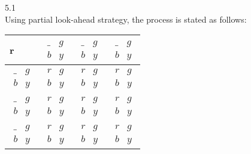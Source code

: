 \documentclass[a4paper]{article}
\begin{document}
5.1\\
Using partial look-ahead strategy, the process is stated as follows:\\
\begin{tabular}{|l|l|l|l|}
\hline
r & $\begin{matrix}   \_ & g \\   b & y  \end{matrix}$ & $\begin{matrix}   \_ & g \\   b & y  \end{matrix}$ & $\begin{matrix}   \_ & g \\   b & y  \end{matrix}$ \\ \hline
$\begin{matrix}   \_ & g \\   b & y  \end{matrix}$ & $\begin{matrix}   r & g \\   b & y  \end{matrix}$ & $\begin{matrix}   r & g \\   b & y  \end{matrix}$ & $\begin{matrix}   r & g \\   b & y  \end{matrix}$ \\ \hline
$\begin{matrix}   \_ & g \\   b & y  \end{matrix}$ & $\begin{matrix}   r & g \\   b & y  \end{matrix}$ & $\begin{matrix}   r & g \\   b & y  \end{matrix}$ & $\begin{matrix}   r & g \\   b & y  \end{matrix}$ \\ \hline
$\begin{matrix}   \_ & g \\   b & y  \end{matrix}$ & $\begin{matrix}   r & g \\   b & y  \end{matrix}$ & $\begin{matrix}   r & g \\   b & y  \end{matrix}$ & $\begin{matrix}   r & g \\   b & y  \end{matrix}$ \\ \hline
\end{tabular}\\\\
\end{document}
